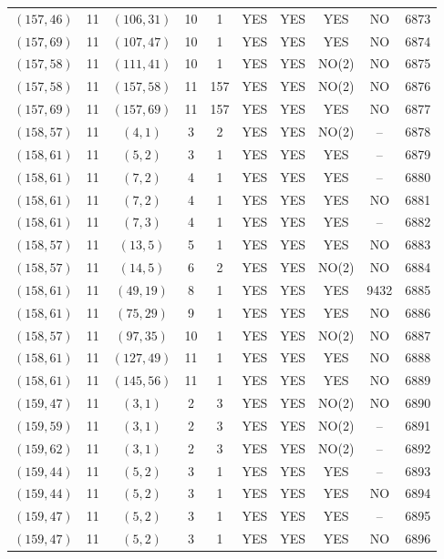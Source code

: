 \begin{longtable}{|c|c|c|c|c|c|c|c|c|c|}
$(157, 46)$ & 11 & $(106, 31)$ & 10 & 1 & YES & YES & YES & NO & 6873\\
$(157, 69)$ & 11 & $(107, 47)$ & 10 & 1 & YES & YES & YES & NO & 6874\\
$(157, 58)$ & 11 & $(111, 41)$ & 10 & 1 & YES & YES & NO(2) & NO & 6875\\
$(157, 58)$ & 11 & $(157, 58)$ & 11 & 157 & YES & YES & NO(2) & NO & 6876\\
$(157, 69)$ & 11 & $(157, 69)$ & 11 & 157 & YES & YES & YES & NO & 6877\\
$(158, 57)$ & 11 & $(4, 1)$ & 3 & 2 & YES & YES & NO(2) & -- & 6878\\
$(158, 61)$ & 11 & $(5, 2)$ & 3 & 1 & YES & YES & YES & -- & 6879\\
$(158, 61)$ & 11 & $(7, 2)$ & 4 & 1 & YES & YES & YES & -- & 6880\\
$(158, 61)$ & 11 & $(7, 2)$ & 4 & 1 & YES & YES & YES & NO & 6881\\
$(158, 61)$ & 11 & $(7, 3)$ & 4 & 1 & YES & YES & YES & -- & 6882\\
$(158, 57)$ & 11 & $(13, 5)$ & 5 & 1 & YES & YES & YES & NO & 6883\\
$(158, 57)$ & 11 & $(14, 5)$ & 6 & 2 & YES & YES & NO(2) & NO & 6884\\
$(158, 61)$ & 11 & $(49, 19)$ & 8 & 1 & YES & YES & YES & 9432 & 6885\\
$(158, 61)$ & 11 & $(75, 29)$ & 9 & 1 & YES & YES & YES & NO & 6886\\
$(158, 57)$ & 11 & $(97, 35)$ & 10 & 1 & YES & YES & NO(2) & NO & 6887\\
$(158, 61)$ & 11 & $(127, 49)$ & 11 & 1 & YES & YES & YES & NO & 6888\\
$(158, 61)$ & 11 & $(145, 56)$ & 11 & 1 & YES & YES & YES & NO & 6889\\
$(159, 47)$ & 11 & $(3, 1)$ & 2 & 3 & YES & YES & NO(2) & NO & 6890\\
$(159, 59)$ & 11 & $(3, 1)$ & 2 & 3 & YES & YES & NO(2) & -- & 6891\\
$(159, 62)$ & 11 & $(3, 1)$ & 2 & 3 & YES & YES & NO(2) & -- & 6892\\
$(159, 44)$ & 11 & $(5, 2)$ & 3 & 1 & YES & YES & YES & -- & 6893\\
$(159, 44)$ & 11 & $(5, 2)$ & 3 & 1 & YES & YES & YES & NO & 6894\\
$(159, 47)$ & 11 & $(5, 2)$ & 3 & 1 & YES & YES & YES & -- & 6895\\
$(159, 47)$ & 11 & $(5, 2)$ & 3 & 1 & YES & YES & YES & NO & 6896\\

\end{longtable}
